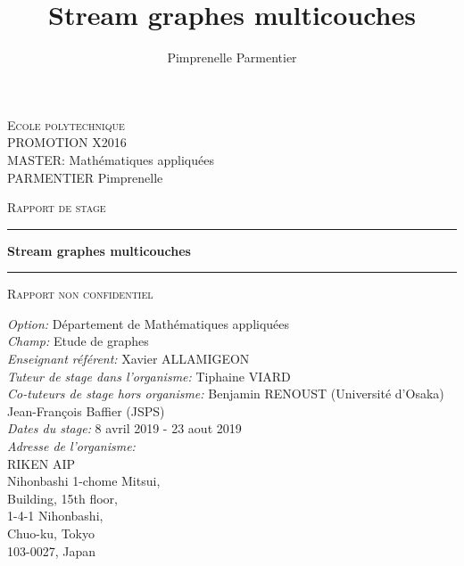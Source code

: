 \documentclass[11pt,a4paper]{article}
\author{Pimprenelle Parmentier}
\title{Stream graphes multicouches}
\theoremstyle{definition}
\theoremstyle{remark}
\theoremstyle{remark}
\begin{document}
\begin{titlepage}


\noindent
\textsc{Ecole polytechnique}\\
PROMOTION X2016 \\
MASTER: Mathématiques appliquées\\
PARMENTIER Pimprenelle

\vspace{3cm}
\begin{center}
\textsc{\Large Rapport de stage}
\vspace{1cm}
\hrule %
\vspace{0.4cm}
{\huge \bfseries Stream graphes multicouches \par}\vspace{0.4cm} %
\hrule 
\vspace{1cm}
\textsc{\Large Rapport non confidentiel}
\vspace{4cm} %
 
\end{center}

\noindent
\textit{Option:} Département de Mathématiques appliquées\\
\textit{Champ:} Etude de graphes\\
\textit{Enseignant référent:} Xavier ALLAMIGEON\\
\textit{Tuteur de stage dans l'organisme:} Tiphaine VIARD\\
\textit {Co-tuteurs de stage hors organisme:} Benjamin RENOUST (Université d'Osaka)\\
\hspace*{6.1cm} Jean-François Baffier (JSPS)\\
\textit{Dates du stage:} 8 avril 2019 - 23 aout 2019\\
\textit{Adresse de l'organisme:}\\
RIKEN AIP\\
Nihonbashi 1-chome Mitsui,\\
Building, 15th floor,\\
1-4-1 Nihonbashi,\\
Chuo-ku, Tokyo\\
103-0027, Japan\\
\end{titlepage}


\begin{abstract}

	


\end{abstract}
\end{document}
